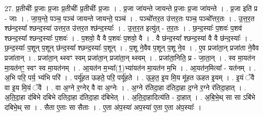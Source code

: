 \documentclass[17pt]{extarticle}
\begin{document}
27. प्र॒तीचीः᳚ प्र॒जाः प्र॒जाः प्र॒तीचीः᳚ प्र॒तीचीः᳚ प्र॒जाः । . प्र॒जा जा॑यन्ते जायन्ते प्र॒जाः प्र॒जा जा॑यन्ते । . प्र॒जा इति॑ प्र - जाः । . जा॒य॒न्ते॒ पञ्च॒ पञ्च॑ जायन्ते जायन्ते॒ पञ्च॑ । . पञ्चो᳚त्तर॒त उ॑त्तर॒तः पञ्च॒ पञ्चो᳚त्तर॒तः । . उ॒त्त॒र॒त श्छ॑न्द॒स्या᳚ श्छन्द॒स्या॑ उत्तर॒त उ॑त्तर॒त श्छ॑न्द॒स्याः᳚ । . उ॒त्त॒र॒त इत्यु॑त् - त॒र॒तः । . छ॒न्द॒स्याः᳚ प॒शवः॑ प॒शव॑ श्छन्द॒स्या᳚ श्छन्द॒स्याः᳚ प॒शवः॑ । . प॒शवो॒ वै वै प॒शवः॑ प॒शवो॒ वै । . वै छ॑न्द॒स्या᳚ श्छन्द॒स्या॑ वै वै छ॑न्द॒स्याः᳚ । . छ॒न्द॒स्याः᳚ प॒शून् प॒शून् छ॑न्द॒स्या᳚ श्छन्द॒स्याः᳚ प॒शून् । . प॒शू ने॒वैव प॒शून् प॒शू ने॒व । . ए॒व प्रजा॑ता॒न् प्रजा॑ता ने॒वैव प्रजा॑तान् । . प्रजा॑ता॒न् थ्स्वꣳ स्वम् प्रजा॑ता॒न् प्रजा॑ता॒न् थ्स्वम् । . प्रजा॑ता॒निति॒ प्र - जा॒ता॒न् । . स्व मा॒यत॑न मा॒यत॑नꣳ॒॒ स्वꣳ स्व मा॒यत॑नम् । . आ॒यत॑न म॒भ्या᳚(1॒)भ्या॑यत॑न मा॒यत॑न म॒भि । . आ॒यत॑न॒मित्या᳚ - यत॑नम् । . अ॒भि परि॒ पर्य॒ भ्य॑भि परि॑ । . पर्यू॑हत ऊहते॒ परि॒ पर्यू॑हते । . ऊ॒ह॒त॒ इ॒य मि॒य मू॑हत ऊहत इ॒यम् । . इ॒यं ॅवै वा इ॒य मि॒यं ॅवै । . वा अ॒ग्ने र॒ग्नेर् वै वा अ॒ग्नेः । . अ॒ग्ने र॑तिदा॒हा द॑तिदा॒हा द॒ग्ने र॒ग्ने र॑तिदा॒हात् । . अ॒ति॒दा॒हा द॑बिभे दबिभे दतिदा॒हा द॑तिदा॒हा द॑बिभेत् । . अ॒ति॒दा॒हादित्य॑ति - दा॒हात् । . अ॒बि॒भे॒थ् सा सा ऽबि॑भे दबिभे॒थ् सा । . सैता ए॒ताः सा सैताः । . ए॒ता अ॑प॒स्या॑ अप॒स्या॑ ए॒ता ए॒ता अ॑प॒स्याः᳚ । \newline
\end{document}
